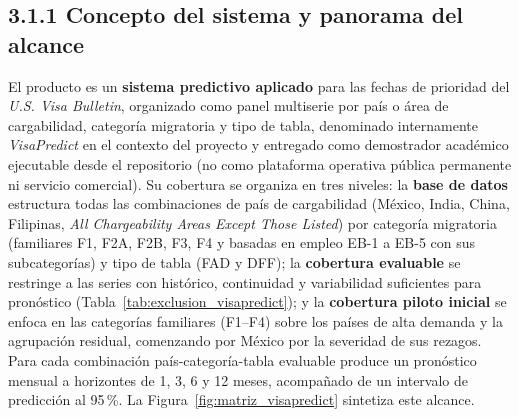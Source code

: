 \documentclass[12pt,letterpaper]{report}
\begin{document}
\subsection*{3.1.1 Concepto del sistema y panorama del alcance}

El producto es un \textbf{sistema predictivo aplicado} para las fechas de prioridad del \textit{U.S. Visa Bulletin}, organizado como panel multiserie por país o área de cargabilidad, categoría migratoria y tipo de tabla, denominado internamente \textit{VisaPredict} en el contexto del proyecto y entregado como demostrador académico ejecutable desde el repositorio (no como plataforma operativa pública permanente ni servicio comercial). Su cobertura se organiza en tres niveles: la \textbf{base de datos} estructura todas las combinaciones de país de cargabilidad (México, India, China, Filipinas, \textit{All Chargeability Areas Except Those Listed}) por categoría migratoria (familiares F1, F2A, F2B, F3, F4 y basadas en empleo EB-1 a EB-5 con sus subcategorías) y tipo de tabla (FAD y DFF); la \textbf{cobertura evaluable} se restringe a las series con histórico, continuidad y variabilidad suficientes para pronóstico (Tabla~\ref{tab:exclusion_visapredict}); y la \textbf{cobertura piloto inicial} se enfoca en las categorías familiares (F1--F4) sobre los países de alta demanda y la agrupación residual, comenzando por México por la severidad de sus rezagos. Para cada combinación país-categoría-tabla evaluable produce un pronóstico mensual a horizontes de 1, 3, 6 y 12 meses, acompañado de un intervalo de predicción al 95\,\%. La Figura~\ref{fig:matriz_visapredict} sintetiza este alcance.
\end{document}

